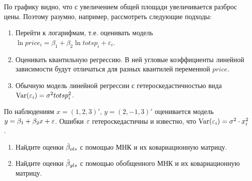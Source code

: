 \begin{problem}
\begin{sol}
По графику видно, что с увеличением общей площади увеличивается разброс цены. Поэтому разумно, например, рассмотреть следующие подходы:
\begin{enumerate}
\item Перейти к логарифмам, т.е. оценивать модель $\ln price_i=\beta_1+\beta_2 \ln totsp_i +\varepsilon_i$.
\item Оценивать квантильную регрессию. В ней угловые коэффициенты линейной зависимости будут отличаться для разных квантилей переменной $price$.
\item Обычную модель линейной регрессии с гетероскедастичностью вида $\operatorname{Var}(\varepsilon_i)=\sigma^2 totsp_i^2$.
\end{enumerate}
\end{sol}
\end{problem}




\begin{problem}
По наблюдениям $x=(1,2,3)'$, $y=(2,-1,3)'$ оценивается модель $y=\beta_1+\beta_2 x+\varepsilon$. Ошибки $\varepsilon$ гетероскедастичны и известно, что $\operatorname{Var}(\varepsilon_i)=\sigma^2 \cdot x_i^2$.
\begin{enumerate}
\item Найдите оценки $\hat{\beta}_{ols}$ с помощью МНК и их ковариационную матрицу.
\item Найдите оценки $\hat{\beta}_{gls}$ с помощью обобщенного МНК и их ковариационную матрицу.
\end{enumerate}


\begin{sol}
\end{sol}
\end{problem}





